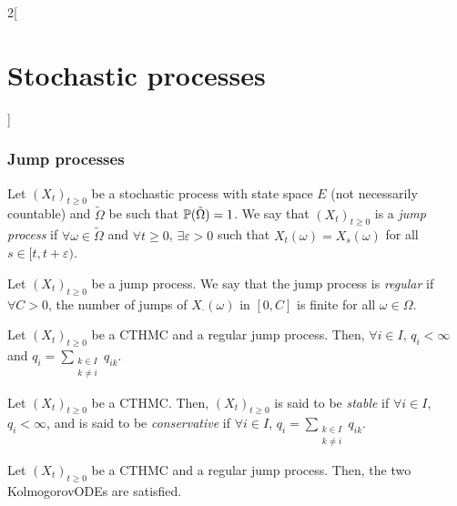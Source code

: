 \documentclass[../../../main_math.tex]{subfiles}
\begin{document}
\begin{multicols}{2}[\section{Stochastic processes}]
  \subsubsection{Jump processes}
  \begin{definition}
    Let ${(X_t)}_{t\geq 0}$ be a stochastic process with state space $E$ (not necessarily countable) and $\tilde\Omega$ be such that $\mathbb{P}(\tilde{\Omega})=1$. We say that ${(X_t)}_{t\geq 0}$ is a \emph{jump process} if $\forall \omega \in \tilde{\Omega}$ and $\forall t\geq 0$, $\exists \varepsilon>0$ such that $X_t(\omega)=X_{s}(\omega)$ for all $s\in[t,t+\varepsilon)$.
  \end{definition}
  \begin{definition}
    Let ${(X_t)}_{t\geq 0}$ be a jump process. We say that the jump process is \emph{regular} if $\forall C>0$, the number of jumps of $X_{\cdot}(\omega)$ in $[0,C]$ is finite for all $\omega\in\Omega$.
  \end{definition}
  \begin{theorem}
    Let ${(X_t)}_{t\geq 0}$ be a CTHMC and a regular jump process. Then, $\forall i\in I$, $q_i<\infty$ and $q_i=\sum_{\substack{k\in I\\k\ne i}}q_{ik}$.
  \end{theorem}
  \begin{definition}
    Let ${(X_t)}_{t\geq 0}$ be a CTHMC. Then, ${(X_t)}_{t\geq 0}$ is said to be \emph{stable} if $\forall i\in I$, $q_i<\infty$, and is said to be \emph{conservative} if $\forall i\in I$, $q_i=\sum_{\substack{k\in I\\k\ne i}}q_{ik}$.
  \end{definition}
  \begin{theorem}
    Let ${(X_t)}_{t\geq 0}$ be a CTHMC and a regular jump process. Then, the two KolmogorovODEs are satisfied.
  \end{theorem}

\end{multicols}
\end{document}
